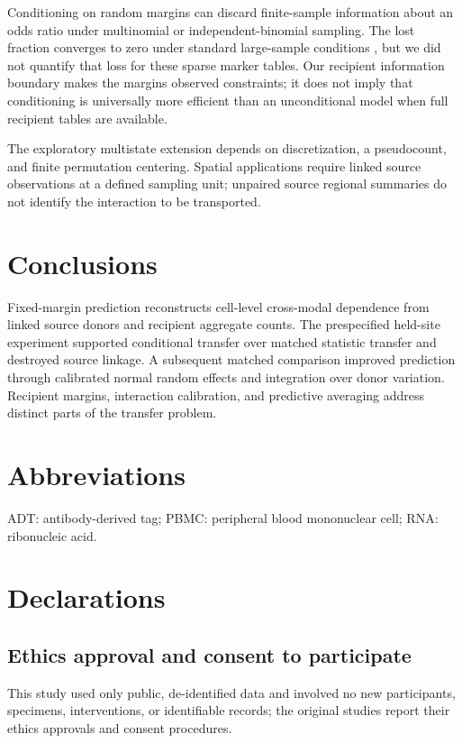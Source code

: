 \documentclass[pdflatex,sn-vancouver-num,iicol]{sn-jnl}
\begin{document}
Conditioning on random margins can discard finite-sample information about an odds ratio under multinomial or independent-binomial sampling. The lost fraction converges to zero under standard large-sample conditions \cite{schervish2025}, but we did not quantify that loss for these sparse marker tables. Our recipient information boundary makes the margins observed constraints; it does not imply that conditioning is universally more efficient than an unconditional model when full recipient tables are available.

The exploratory multistate extension depends on discretization, a pseudocount, and finite permutation centering. Spatial applications require linked source observations at a defined sampling unit; unpaired source regional summaries do not identify the interaction to be transported.

\section{Conclusions}

Fixed-margin prediction reconstructs cell-level cross-modal dependence from linked source donors and recipient aggregate counts. The prespecified held-site experiment supported conditional transfer over matched statistic transfer and destroyed source linkage. A subsequent matched comparison improved prediction through calibrated normal random effects and integration over donor variation. Recipient margins, interaction calibration, and predictive averaging address distinct parts of the transfer problem.

\section*{Abbreviations}
ADT: antibody-derived tag; PBMC: peripheral blood mononuclear cell; RNA: ribonucleic acid.

\section*{Declarations}

\subsection*{Ethics approval and consent to participate}
This study used only public, de-identified data and involved no new participants, specimens, interventions, or identifiable records; the original studies report their ethics approvals and consent procedures.
\end{document}
